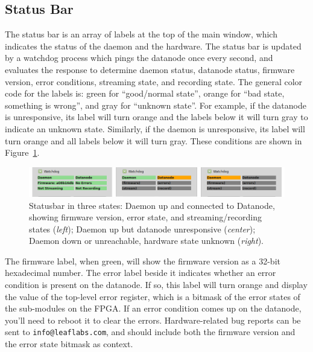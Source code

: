 \subsection{Status Bar}
\label{sec_usage_statusbar}

The status bar is an array of labels at the top of the main window, which indicates the status of the daemon and the hardware. The status bar is updated by a watchdog process which pings the datanode once every second, and evaluates the response to determine daemon status, datanode status, firmware version, error conditions, streaming state, and recording state. The general color code for the labels is: green for ``good/normal state'', orange for ``bad state, something is wrong'', and gray for ``unknown state''. For example, if the datanode is unresponsive, its label will turn orange and the labels below it will turn gray to indicate an unknown state. Similarly, if the daemon is unresponsive, its label will turn orange and all labels below it will turn gray. These conditions are shown in Figure~\ref{fig_statusbar}.

\begin{figure}[h!]
\begin{center}
\includegraphics[width=17cm]{screenshots/statusbar_threestates.png}
\end{center}
\caption{Statusbar in three states: Daemon up and connected to Datanode, showing firmware version, error state, and streaming/recording states (\textit{left}); Daemon up but datanode unresponsive (\textit{center}); Daemon down or unreachable, hardware state unknown (\textit{right}).}
\label{fig_statusbar}
\end{figure}

The firmware label, when green, will show the firmware version as a 32-bit hexadecimal number. The error label beside it indicates whether an error condition is present on the datanode. If so, this label will turn orange and display the value of the top-level error register, which is a bitmask of the error states of the sub-modules on the FPGA. If an error condition comes up on the datanode, you'll need to reboot it to clear the errors. Hardware-related bug reports can be sent to \texttt{info@leaflabs.com}, and should include both the firmware version and the error state bitmask as context.

